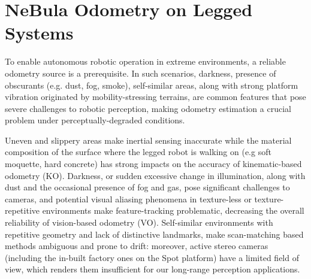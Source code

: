 \documentclass[letterpaper, 10pt, conference]{ieeeconf}      %
\newcommand{\ph}[1]{{\textbf{#1}:}} %
\begin{document}









\section{NeBula Odometry on Legged Systems}\label{sec:state_estimation}
To enable autonomous robotic operation in extreme environments, a reliable odometry source is a prerequisite. In such scenarios, darkness, presence of obscurants (e.g. dust, fog, smoke), self-similar areas, along with strong platform vibration originated by mobility-stressing terrains, are common features that pose severe challenges to robotic perception, making odometry estimation a crucial problem under perceptually-degraded conditions.

Uneven and slippery areas make inertial sensing inaccurate while the material composition of the surface where the legged robot is walking on (e.g soft moquette, hard concrete) has strong impacts on the accuracy of kinematic-based odometry (KO). Darkness, or sudden excessive change in illumination, along with dust and the occasional presence of fog and gas, pose significant challenges to cameras, and potential visual aliasing phenomena in texture-less or texture-repetitive environments make feature-tracking problematic, decreasing the overall reliability of vision-based odometry (VO). Self-similar environments with repetitive geometry and lack of distinctive landmarks, make scan-matching based methods ambiguous and prone to drift: moreover, active stereo cameras (including the in-built factory ones on the Spot platform) have a limited field of view, which renders them insufficient for our long-range perception applications.
\end{document}
